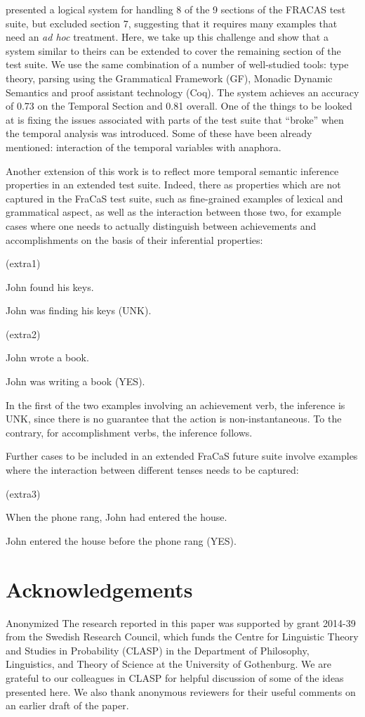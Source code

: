 \documentclass[a4paper,twoside]{article}
\newcommand\hyp{\item[H]}
\newcommand\fracasex[2]{\begin{lingex}\item[(#1)] \begin{subex} #2 \end{subex} \end{lingex} }
\begin{document}
\cite{bernardy_wide-coverage_2019} presented a
logical system for handling 8 of the 9 sections of the FRACAS test
suite, but excluded section 7, suggesting that it requires many
examples that need an \textit{ad hoc} treatment. Here, we take up this
challenge and show that a system similar to theirs can be extended to
cover the remaining section of the test suite.
%
We use the same combination of a number of well-studied tools: type
theory, parsing using the Grammatical Framework (GF), Monadic Dynamic
Semantics and proof assistant technology (Coq). The system achieves an
accuracy of 0.73 on the Temporal Section and 0.81 overall.
One of the
things to be looked at is fixing the issues associated with parts of
the test suite that ``broke'' when the temporal analysis was
introduced. Some of these have been already mentioned: interaction of
the temporal variables with anaphora.

Another extension of this work is to reflect more temporal semantic
inference properties in an extended test suite. Indeed, there as properties which are
not captured in the FraCaS test suite, such as fine-grained examples of lexical and
grammatical aspect, as well as the interaction between those two, for example
cases where one needs to actually distinguish between achievements and
accomplishments on the basis of their inferential properties:

\fracasex{extra1}{
	\item	John found his keys.  
	\hyp 	John was finding his keys  (UNK).
}

\fracasex{extra2}{
	\item	John wrote a book.  
	\hyp 	John was writing a book  (YES).
}

In the first of the two examples involving an achievement verb, the
inference is UNK, since there is no guarantee that the action is
non-instantaneous. To the contrary, for accomplishment verbs, the
inference follows.

Further cases to be included in an extended FraCaS future suite
involve examples where the interaction between different tenses needs
to be captured:

\fracasex{extra3}{
	\item	When the phone rang, John had entered the house.  
	\hyp 	John entered the house before the phone rang (YES).
}



\section*{Acknowledgements}

\ifanon
Anonymized
\else
The research reported in this paper was supported by grant 2014-39 from the
Swedish Research Council, which funds the Centre for Linguistic Theory and
Studies in Probability (CLASP) in the Department of Philosophy, Linguistics,
and Theory of Science at the University of Gothenburg. We are grateful to
our colleagues in CLASP for helpful discussion of some of the ideas presented
here. We also thank anonymous reviewers for their useful comments on an
earlier draft of the paper.
\fi



\end{document}
